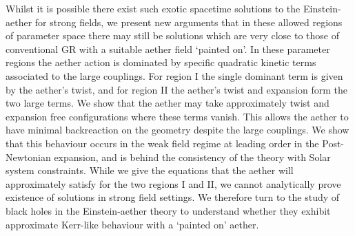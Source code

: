 \documentclass[12pt]{article}
\numberwithin{equation}{section}
\begin{document}
Whilst it is possible there exist such exotic spacetime solutions to the Einstein-aether for strong fields, we present new arguments that in these allowed regions of parameter space there may still be solutions which are very close to those of conventional GR with a suitable aether field `painted on'.
 In these parameter regions the aether action is dominated by specific quadratic kinetic terms associated to the large couplings.
 For region I the single dominant term is given by the aether's twist, and for region II the aether's twist and expansion form the two large terms.
 We show that the aether may take approximately twist and expansion free configurations where these terms vanish. This allows the aether to have minimal backreaction on the geometry despite the large couplings. 
%
We show that this behaviour occurs in the weak field regime at leading order in the Post-Newtonian expansion, and is behind the consistency of the theory with Solar system constraints. While we give the equations that the aether will approximately satisfy for the two regions I and II, we cannot analytically prove existence of solutions in strong field settings.
%
We therefore turn to the study of black holes in the Einstein-aether theory to understand whether they exhibit approximate Kerr-like behaviour with a `painted on' aether.
\end{document}
